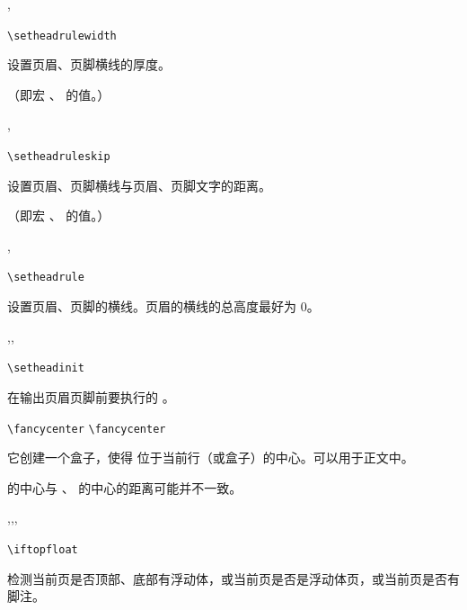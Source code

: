 \documentclass{cusdoc}
\begin{document}
\begin{function}{\setheadrulewidth,\setfootrulewidth}
  \begin{syntax}
    \verb|\setheadrulewidth| 
  \end{syntax}
设置页眉、页脚横线的厚度。

（即宏 、 的值。）
\end{function}

\begin{function}{\setheadruleskip,\setfootruleskip}
  \begin{syntax}
    \verb|\setheadruleskip| 
  \end{syntax}
设置页眉、页脚横线与页眉、页脚文字的距离。

（即宏 、 的值。）
\end{function}

\begin{function}{\setheadrule,\setfootrule}
  \begin{syntax}
    \verb|\setheadrule| 
  \end{syntax}
设置页眉、页脚的横线。页眉的横线的总高度最好为 0。
\end{function}

\begin{function}{\setheadinit,\setfootinit,\setheadfootinit}
  \begin{syntax}
    \verb|\setheadinit| 
  \end{syntax}
在输出页眉页脚前要执行的 。
\end{function}

\begin{function}{\fancycenter}
  \begin{syntax}
    \verb|\fancycenter|   
    \verb|\fancycenter|     
  \end{syntax}
它创建一个盒子，使得  位于当前行（或盒子）的中心。可以用于正文中。

 的中心与 、 的中心的距离可能并不一致。
\end{function}

\begin{xample}
\stopxamplecode
\xampleprint
\end{xample}

\begin{function}[EXP]{\iftopfloat,\ifbotfloat,\iffloatpage,\iffootnote}
  \begin{syntax}
    \verb|\iftopfloat|  
  \end{syntax}
检测当前页是否顶部、底部有浮动体，或当前页是否是浮动体页，或当前页是否有脚注。
\end{function}
\end{document}
